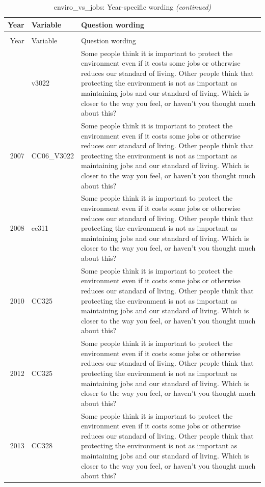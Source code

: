 \documentclass[12pt]{article}
\begin{document}
\begin{longtable}[t]{rl>{\raggedright\arraybackslash}p{10cm}}
\caption{\label{tab:unnamed-chunk-4}enviro\_vs\_jobs: Year-specific wording}\\
\toprule
Year & Variable & Question wording\\
\midrule
\endfirsthead
\caption[]{enviro\_vs\_jobs: Year-specific wording \textit{(continued)}}\\
\toprule
Year & Variable & Question wording\\
\midrule
\endhead
\
\endfoot
\bottomrule
\endlastfoot
2006 & v3022 & Some people think it is important to protect the environment even if it costs some jobs or otherwise reduces our standard of living. Other people think that protecting the environment is not as important as maintaining jobs and our standard of living.  Which is closer to the way you feel, or haven't you thought much about this?\\
2007 & CC06\_V3022 & Some people think it is important to protect the environment even if it costs some jobs or otherwise reduces our standard of living. Other people think that protecting the environment is not as important as maintaining jobs and our standard of living. Which is closer to the way you feel, or haven't you thought much about this?\\
2008 & cc311 & Some people think it is important to protect the environment even if it costs some jobs or otherwise reduces our standard of living. Other people think that protecting the environment is not as important as maintaining jobs and our standard of living. Which is closer to the way you feel, or haven't you thought much about this?\\
2010 & CC325 & Some people think it is important to protect the environment even if it costs some jobs or otherwise reduces our standard of living. Other people think that protecting the environment is not as important as maintaining jobs and our standard of living. Which is closer to the way you feel, or haven't you thought much about this?\\
2012 & CC325 & Some people think it is important to protect the environment even if it costs some jobs or otherwise reduces our standard of living. Other people think that protecting the environment is not as important as maintaining jobs and our standard of living. Which is closer to the way you feel, or haven’t you thought much about this?\\
2013 & CC328 & Some people think it is important to protect the environment even if it costs some jobs or otherwise reduces our standard of living. Other people think that protecting the environment is not as important as maintaining jobs and our standard of living. Which is closer to the way you feel, or haven't you thought much about this?\\*
\end{longtable}
\end{document}
